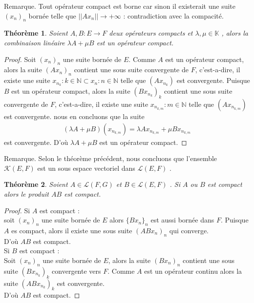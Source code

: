 \documentclass{report}
\newtheorem{The}{Théorème}[subsection]
\begin{document}
{Remarque. Tout opérateur compact est borne car sinon il existerait une suite $(x_n)_n$ bornée telle que $||A x_n|| \rightarrow + \infty$ : contradiction avec la compacité.\\

\begin{The} Soient $A,B : E \rightarrow F$ deux opérateurs compacts et $\lambda, \mu \in \mathbb{K}$ , alors la combinaison linéaire $\lambda A + \mu B$ est un opérateur compact.\\
\end{The}
\begin{proof}
Soit $(x_n)_n$ une suite bornée de $E$. Comme $A$ est un opérateur compact, alors la suite $(A x_n)_n$ contient une sous suite convergente de $F$, c'est-a-dire, il existe une suite ${ x_{n_k} : k \in \mathbb{N}} \subset {x_n : n \in \mathbb{N}}$ telle que $(A x_{n_k})$ est convergente. Puisque $B$ est un opérateur compact, alors la suite $(B x_{n_k})_k$ contient une sous suite convergente de $F$, c'est-a-dire, il existe une suite ${ x_{n_{k,m}} : m \in \mathbb{N}}$ telle que $(A x_{n_{k,m}})$ est convergente. nous en concluons que la suite 
									\begin{align*}
						 (\lambda A + \mu B)(x_{n_{k,m}}) = \lambda A x_{n_{k,m}} + \mu B x_{n_{k,m}} 
									\end{align*}
est convergente. D'où $\lambda A + \mu B$ est un opérateur compact.
\end{proof}


Remarque. Selon le théorème précédent, nous concluons que l'ensemble $\mathscr{K}(E,F)$ est un sous espace vectoriel dans $\mathscr{L}(E,F)$ .\\

\begin{The} Soient $A \in \mathscr{L}(F,G)$ et $B \in \mathscr{L}(E,F)$ . Si $A$ ou $B$ est compact alors le produit $AB$ est compact. \\
\end{The}
\begin{proof}
Si $A$ est compact :\\
soit $(x_n)_n$ une suite bornée de $E$ alors $\{B x_n\}_n$ est aussi bornée dans $F$. Puisque $A$ es compact, alors il existe une sous suite $(A B x_n)_n$ qui converge.\\
D'où $AB$ est compact.\\
Si $B$ est compact :\\
Soit $(x_n)_n$ une suite bornée de $E$, alors la suite $(B x_n)_n$ contient une sous suite $(B x_{n_k})_k$ convergente vers $F$. Comme $A$ est un opérateur continu alors la suite $(A B x_{n_k})_k$ est convergente. \\
D'où $AB$ est compact.
\end{proof}


}
\end{document}
